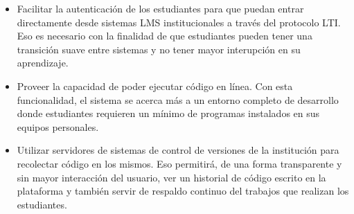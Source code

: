 \begin{itemize}
	\item Facilitar la autenticación de los estudiantes para que puedan entrar directamente desde sistemas LMS  institucionales a través del protocolo LTI. Eso es necesario con la finalidad de que estudiantes pueden tener una transición suave entre sistemas y no tener mayor interupción en su aprendizaje. 
	\item {} Proveer la capacidad de poder ejecutar código en línea. Con esta funcionalidad, el sistema se acerca más a un entorno completo de desarrollo donde estudiantes requieren un mínimo de programas instalados en sus equipos personales. 
	\item {} Utilizar servidores de sistemas de control de versiones de la institución para recolectar código en los mismos. Eso permitirá, de una forma transparente y sin mayor interacción del usuario, ver un historial de código escrito en la plataforma y también servir de respaldo continuo del trabajos que realizan los estudiantes.  
\end{itemize}

